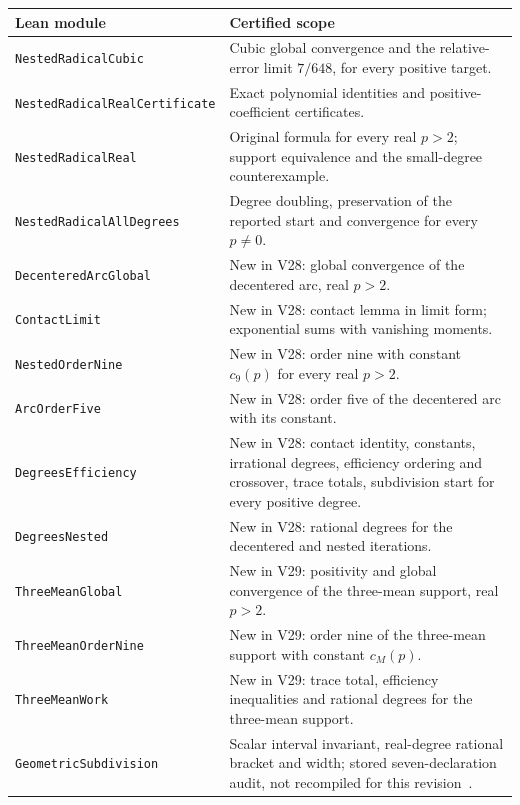 \begin{center}\small
\begin{tabularx}{\linewidth}{@{}lX@{}}
\toprule
Lean module & Certified scope\\
\midrule
\texttt{NestedRadicalCubic} & Cubic global convergence and the relative-error limit $7/648$, for every
positive target.\\
\texttt{NestedRadicalRealCertificate} & Exact polynomial identities and positive-coefficient
certificates.\\
\texttt{NestedRadicalReal} & Original formula for every real $p>2$; support equivalence and the
small-degree counterexample.\\
\texttt{NestedRadicalAllDegrees} & Degree doubling, preservation of the reported start and convergence
for every $p\neq0$.\\
\texttt{DecenteredArcGlobal} & New in V28: global convergence of the decentered arc, real $p>2$.\\
\texttt{ContactLimit} & New in V28: contact lemma in limit form; exponential sums with vanishing moments.\\
\texttt{NestedOrderNine} & New in V28: order nine with constant $c_9(p)$ for every real $p>2$.\\
\texttt{ArcOrderFive} & New in V28: order five of the decentered arc with its constant.\\
\texttt{DegreesEfficiency} & New in V28: contact identity, constants, irrational degrees, efficiency ordering
and crossover, trace totals, subdivision start for every positive degree.\\
\texttt{DegreesNested} & New in V28: rational degrees for the decentered and nested iterations.\\
\texttt{ThreeMeanGlobal} & New in V29: positivity and global convergence of the three-mean support, real $p>2$.\\
\texttt{ThreeMeanOrderNine} & New in V29: order nine of the three-mean support with constant $c_M(p)$.\\
\texttt{ThreeMeanWork} & New in V29: trace total, efficiency inequalities and rational degrees for the
three-mean support.\\
\texttt{GeometricSubdivision} & Scalar interval invariant, real-degree rational bracket and width;
stored seven-declaration audit, not recompiled for this revision~\cite{supplS}.\\
\bottomrule
\end{tabularx}
\end{center}

